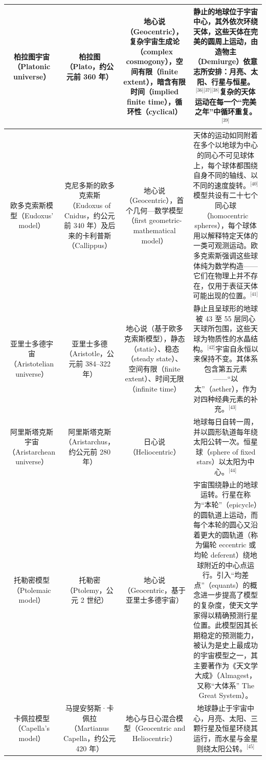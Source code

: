 \begin{table}[ht]
\begin{tabular}{|c|c|c|c|}
\hline
柏拉图宇宙（Platonic universe）& 柏拉图（Plato，约公元前 360 年）& 地心说（Geocentric），复杂宇宙生成论（complex cosmogony），空间有限（finite extent），暗含有限时间（implied finite time），循环性（cyclical）& 静止的地球位于宇宙中心，其外依次环绕天体，这些天体在完美的圆周上运动，由造物主（Demiurge）依意志所安排：月亮、太阳、行星与恒星。\(^\text{[36][37][38]}\)复杂的天体运动在每一个“完美之年”中循环重复。\(^\text{[39]}\)\\
\hline
欧多克索斯模型（Eudoxus' model）& 克尼多斯的欧多克索斯（Eudoxus of Cnidus，约公元前 340 年）及后来的卡利普斯（Callippus）& 地心说（Geocentric），首个几何—数学模型（first geometric-mathematical model）& 天体的运动如同附着在多个以地球为中心的同心不可见球体上，每个球体都围绕自身不同的轴线、以不同的速度旋转。\(^\text{[40]}\)模型共设有二十七个同心球（homocentric spheres），每个球体用以解释特定天体的一类可观测运动。欧多克索斯强调这些球体纯为数学构造——它们在物理上并不存在，仅用于表征天体可能出现的位置。\(^\text{[41]}\)\\
\hline
亚里士多德宇宙（Aristotelian universe）& 亚里士多德（Aristotle，公元前 384–322 年）& 地心说（基于欧多克索斯模型），静态（static）、稳态（steady state）、空间有限（finite extent）、时间无限（infinite time）& 静止且呈球形的地球被 43 至 55 层同心天球所包围，这些天球为物质性的水晶结构。\(^\text{[42]}\)宇宙自永恒以来保持不变。其体系包含第五元素——“以太”（aether），作为对四种经典元素的补充。\(^\text{[43]}\)\\
\hline
阿里斯塔克斯宇宙（Aristarchean universe）& 阿里斯塔克斯（Aristarchus，约公元前 280 年）& 日心说（Heliocentric）& 地球每日自转一周，并以圆形轨道每年绕太阳公转一次。恒星球（sphere of fixed stars）以太阳为中心。\(^\text{[44]}\)\\
\hline
托勒密模型（Ptolemaic model）& 托勒密（Ptolemy，公元 2 世纪）& 地心说（Geocentric，基于亚里士多德宇宙）& 宇宙围绕静止的地球运转。行星在称为“本轮”（epicycle）的圆轨道上运动，而每个本轮的圆心又沿着更大的圆轨道（称为偏轮 eccentric 或均轮 deferent）绕地球附近的中心点运行。引入“均差点”（equants）的概念进一步提高了模型的复杂度，使天文学家得以精确预测行星位置。此模型因其长期稳定的预测能力，被认为是史上最成功的宇宙模型之一，其主要著作为《天文学大成》（Almagest，又称“大体系” The Great System）。\\
\hline
卡佩拉模型（Capella's model）& 马提安努斯·卡佩拉（Martianus Capella，约公元 420 年）& 地心与日心混合模型（Geocentric and Heliocentric）& 地球静止于宇宙中心，月亮、太阳、三颗行星及恒星环绕其运行，而水星与金星则绕太阳公转。\(^\text{[45]}\)\\
\hline

\end{tabular}
\end{table}
